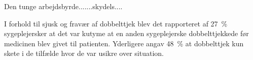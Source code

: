 Den tunge arbejdsbyrde.......skydels....

I forhold til sjusk og fravær af dobbelttjek blev det rapporteret af 27~\% sygeplejersker at det var kutyme at en anden sygeplejerske dobbelttjekkede før medicinen blev givet til patienten. Yderligere angav 48~\% at dobbelttjek kun skete i de tilfælde hvor de var usikre over situation. 

 

%
%
%
%
%
%
%
